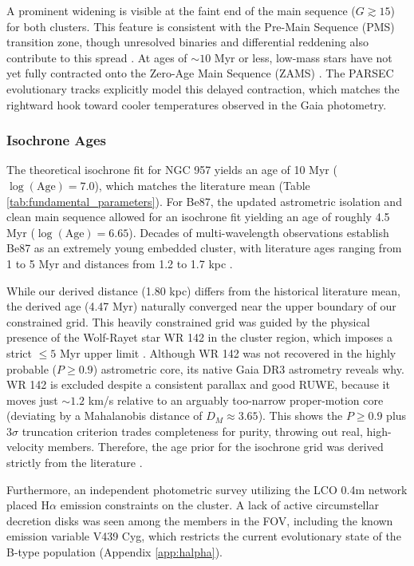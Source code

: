 \documentclass{CU_IOPStyle_PXT999}
\begin{document}
A prominent widening is visible at the faint end of the main sequence ($G \gtrsim 15$) for both clusters. This feature is consistent with the Pre-Main Sequence (PMS) transition zone, though unresolved binaries and differential reddening also contribute to this spread \cite{cantat-gaudin_gaia_2018, cantat-gaudin_milky_2022}. At ages of $\sim10$ Myr or less, low-mass stars have not yet fully contracted onto the Zero-Age Main Sequence (ZAMS) \cite{Soderblom_2014}. The PARSEC evolutionary tracks explicitly model this delayed contraction, which matches the rightward hook toward cooler temperatures observed in the Gaia photometry.

\subsubsection{Isochrone Ages}
\label{ssec:4.3.1}

The theoretical isochrone fit for NGC 957 yields an age of 10 Myr ($\log(\text{Age}) = 7.0$), which matches the literature mean (Table \ref{tab:fundamental_parameters}). For Be87, the updated astrometric isolation and clean main sequence allowed for an isochrone fit yielding an age of roughly 4.5 Myr ($\log(\text{Age}) = 6.65$). Decades of multi-wavelength observations establish Be87 as an extremely young embedded cluster, with literature ages ranging from 1 to 5 Myr and distances from 1.2 to 1.7 kpc \cite{turner_berkeley_1982, cantat-gaudin_painting_2020}. 

While our derived distance (1.80 kpc) differs from the historical literature mean, the derived age (4.47 Myr) naturally converged near the upper boundary of our constrained grid. This heavily constrained grid was guided by the physical presence of the Wolf-Rayet star WR 142 in the cluster region, which imposes a strict $\le 5$ Myr upper limit \cite{crowther_2007}. Although WR 142 was not recovered in the highly probable ($P \ge 0.9$) astrometric core, its native Gaia DR3 astrometry reveals why. WR 142 is excluded despite a consistent parallax and good RUWE, because it moves just $\sim 1.2$ km/s relative to an arguably too-narrow proper-motion core (deviating by a Mahalanobis distance of $D_M \approx 3.65$). This shows the $P \ge 0.9$ plus $3\sigma$ truncation criterion trades completeness for purity, throwing out real, high-velocity members. Therefore, the age prior for the isochrone grid was derived strictly from the literature \cite{turner_berkeley_1982, sokal_chandra_2010}.

Furthermore, an independent photometric survey utilizing the LCO 0.4m network placed H$\alpha$ emission constraints on the cluster. A lack of active circumstellar decretion disks was seen among the members in the FOV, including the known emission variable V439 Cyg, which restricts the current evolutionary state of the B-type population (Appendix \ref{app:halpha}).
\end{document}
